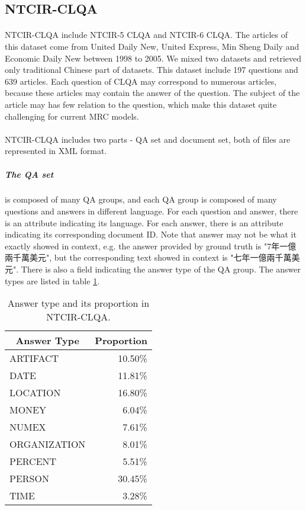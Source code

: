 \documentclass{article}
\begin{document}
\subsection{NTCIR-CLQA}
\paragraph{}
NTCIR-CLQA include NTCIR-5 CLQA\cite{sasaki2005ntcir5} and NTCIR-6\cite{sasaki2005ntcir6} CLQA. The articles of this dataset come from United Daily New, United Express, Min Sheng Daily and Economic Daily New between 1998 to 2005. We mixed two datasets and retrieved only traditional Chinese part of datasets. This dataset include 197 questions and 639 articles. Each question of CLQA may correspond to numerous articles, because these articles may contain the answer of the question. The subject of the article may has few relation to the question, which make this dataset quite challenging for current MRC models.

\paragraph{}
NTCIR-CLQA includes two parts - QA set and document set, both of files are represented in XML format.

\begin{CJK*}{UTF8}{bsmi}
\subparagraph{The QA set} is composed of many QA groups, and each QA group is composed of many questions and answers in different language. For each question and answer, there is an attribute indicating its language. For each answer, there is an attribute indicating its corresponding document ID. Note that answer may not be what it exactly showed in context, e.g. the answer provided by ground truth is "7年一億兩千萬美元", but the corresponding text showed in context is "七年一億兩千萬美元". There is also a field indicating the answer type of the QA group. The answer types are listed in table \ref{tab:answer-types}.
\end{CJK*}

\begin{table}[ht!]
  \centering
  \begin{tabular}{lr}
    \multicolumn{1}{c}{Answer Type} & \multicolumn{1}{c}{Proportion} \\
    \toprule
    ARTIFACT & 10.50\% \\
    DATE & 11.81\% \\
    LOCATION & 16.80\% \\
    MONEY & 6.04\% \\
    NUMEX & 7.61\% \\
    ORGANIZATION & 8.01\% \\
    PERCENT & 5.51\% \\
    PERSON & 30.45\% \\
    TIME & 3.28\%
  \end{tabular}
  \caption{Answer type and its proportion in NTCIR-CLQA.}
  \label{tab:answer-types}
\end{table}
\end{document}
